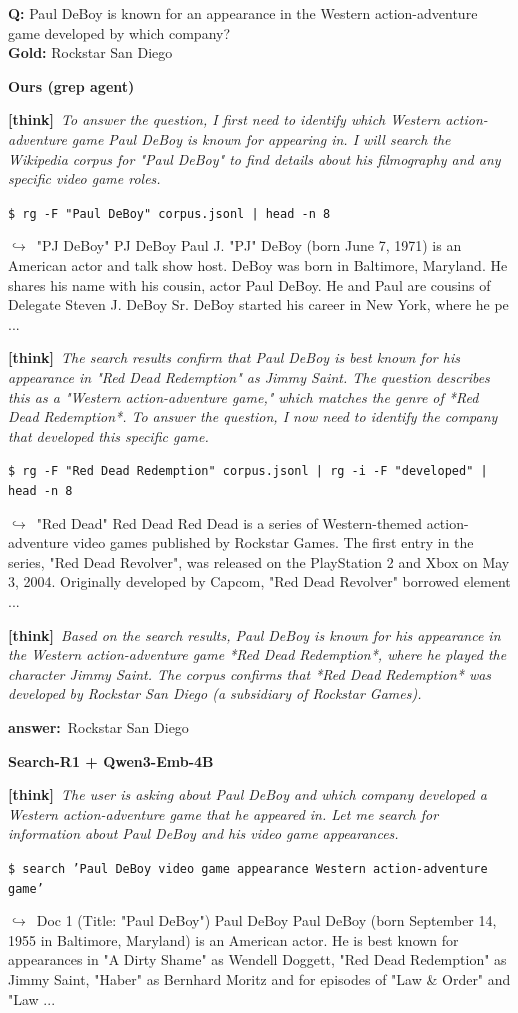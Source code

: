 \documentclass{llmxive}
\providecommand{\cmark}{\ding{51}}
\providecommand{\xmark}{\ding{55}}
\providecommand{\winbadge}{\colorbox{green!50!black}{\scriptsize\bfseries\,WIN\,}}
\providecommand{\thk}[1]{{\footnotesize\textbf{[think]}\ \textit{#1}\par}}
\providecommand{\cmd}[1]{{\footnotesize\texttt{\$\ #1}\par}}
\providecommand{\retr}[1]{{\footnotesize\quad$\hookrightarrow$\ #1\par}}
\providecommand{\ans}[1]{{\footnotesize\textbf{answer:}\ #1\par}}
\begin{document}
\begin{cmpbox}[label={ex:hotpot-rockstar},title={\winbadge\ \ \textsc{HotpotQA -- entity precision (subsidiary vs.\ parent)}}]
\textbf{Q:} Paul DeBoy is known for an appearance in the Western action-adventure game developed by which company?\\[1pt]
\textbf{Gold:} Rockstar San Diego\par\smallskip
\textbf{Ours (grep agent)}~\cmark\par
  \thk{To answer the question, I first need to identify which Western action-adventure game Paul DeBoy is known for appearing in. I will search the Wikipedia corpus for "Paul DeBoy" to find details about his filmography and any specific video game roles.}
  \cmd{rg -F "Paul DeBoy" corpus.jsonl | head -n 8}
  \retr{"PJ DeBoy" PJ DeBoy Paul J. "PJ" DeBoy (born June 7, 1971) is an American actor and talk show host. DeBoy was born in Baltimore, Maryland. He shares his name with his cousin, actor Paul DeBoy. He and Paul are cousins of Delegate Steven J. DeBoy Sr. DeBoy started his career in New York, where he pe ...}
  \thk{The search results confirm that Paul DeBoy is best known for his appearance in "Red Dead Redemption" as Jimmy Saint. The question describes this as a "Western action-adventure game," which matches the genre of *Red Dead Redemption*. To answer the question, I now need to identify the company that developed this specific game.}
  \cmd{rg -F "Red Dead Redemption" corpus.jsonl | rg -i -F "developed" | head -n 8}
  \retr{"Red Dead" Red Dead Red Dead is a series of Western-themed action-adventure video games published by Rockstar Games. The first entry in the series, "Red Dead Revolver", was released on the PlayStation 2 and Xbox on May 3, 2004. Originally developed by Capcom, "Red Dead Revolver" borrowed element ...}
  \thk{Based on the search results, Paul DeBoy is known for his appearance in the Western action-adventure game *Red Dead Redemption*, where he played the character Jimmy Saint. The corpus confirms that *Red Dead Redemption* was developed by Rockstar San Diego (a subsidiary of Rockstar Games).}
  \ans{Rockstar San Diego}
\smallskip\par\textbf{Search-R1 + Qwen3-Emb-4B}~\xmark\par
  \thk{The user is asking about Paul DeBoy and which company developed a Western action-adventure game that he appeared in. Let me search for information about Paul DeBoy and his video game appearances.}
  \cmd{search 'Paul DeBoy video game appearance Western action-adventure game'}
  \retr{Doc 1 (Title: "Paul DeBoy") Paul DeBoy Paul DeBoy (born September 14, 1955 in Baltimore, Maryland) is an American actor. He is best known for appearances in "A Dirty Shame" as Wendell Doggett, "Red Dead Redemption" as Jimmy Saint, "Haber" as Bernhard Moritz and for episodes of "Law \& Order" and "Law ...}

\end{cmpbox}
\end{document}
